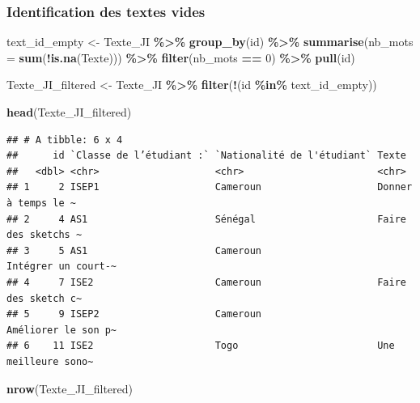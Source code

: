 \documentclass[
]{article}
\newenvironment{Shaded}{\begin{snugshade}}{\end{snugshade}}
\newcommand{\AttributeTok}[1]{\textcolor[rgb]{0.13,0.29,0.53}{#1}}
\newcommand{\DecValTok}[1]{\textcolor[rgb]{0.00,0.00,0.81}{#1}}
\newcommand{\FunctionTok}[1]{\textcolor[rgb]{0.13,0.29,0.53}{\textbf{#1}}}
\newcommand{\NormalTok}[1]{#1}
\newcommand{\OtherTok}[1]{\textcolor[rgb]{0.56,0.35,0.01}{#1}}
\newcommand{\SpecialCharTok}[1]{\textcolor[rgb]{0.81,0.36,0.00}{\textbf{#1}}}
\begin{document}
\subsubsection{Identification des textes
vides}\label{identification-des-textes-vides}

\begin{Shaded}
\begin{Highlighting}[]
\NormalTok{text\_id\_empty }\OtherTok{\textless{}{-}}\NormalTok{ Texte\_JI }\SpecialCharTok{\%\textgreater{}\%}
  \FunctionTok{group\_by}\NormalTok{(id) }\SpecialCharTok{\%\textgreater{}\%}
  \FunctionTok{summarise}\NormalTok{(}\AttributeTok{nb\_mots =} \FunctionTok{sum}\NormalTok{(}\SpecialCharTok{!}\FunctionTok{is.na}\NormalTok{(Texte))) }\SpecialCharTok{\%\textgreater{}\%}
  \FunctionTok{filter}\NormalTok{(nb\_mots }\SpecialCharTok{==} \DecValTok{0}\NormalTok{) }\SpecialCharTok{\%\textgreater{}\%}
  \FunctionTok{pull}\NormalTok{(id)}

\NormalTok{Texte\_JI\_filtered }\OtherTok{\textless{}{-}}\NormalTok{ Texte\_JI }\SpecialCharTok{\%\textgreater{}\%} 
  \FunctionTok{filter}\NormalTok{(}\SpecialCharTok{!}\NormalTok{(id }\SpecialCharTok{\%in\%}\NormalTok{ text\_id\_empty))}

\FunctionTok{head}\NormalTok{(Texte\_JI\_filtered)}
\end{Highlighting}
\end{Shaded}

\begin{verbatim}
## # A tibble: 6 x 4
##      id `Classe de l’étudiant :` `Nationalité de l'étudiant` Texte              
##   <dbl> <chr>                    <chr>                       <chr>              
## 1     2 ISEP1                    Cameroun                    Donner à temps le ~
## 2     4 AS1                      Sénégal                     Faire des sketchs ~
## 3     5 AS1                      Cameroun                    Intégrer un court-~
## 4     7 ISE2                     Cameroun                    Faire des sketch c~
## 5     9 ISEP2                    Cameroun                    Améliorer le son p~
## 6    11 ISE2                     Togo                        Une meilleure sono~
\end{verbatim}

\begin{Shaded}
\begin{Highlighting}[]
\FunctionTok{nrow}\NormalTok{(Texte\_JI\_filtered)}
\end{Highlighting}
\end{Shaded}
\end{document}
